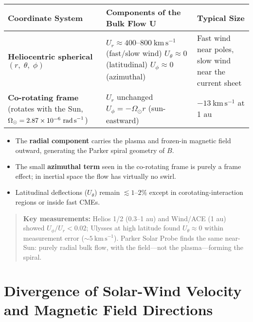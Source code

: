\begin{table}[h!]
\centering
\begin{tabular}{|p{7cm}|p{7cm}|p{4cm}|}
\hline
\textbf{Coordinate System} & \textbf{Components of the Bulk Flow $\mathbf{U}$} & \textbf{Typical Size} \\
\hline
\textbf{Heliocentric spherical} $(r,\;\theta,\;\phi)$
& 
$U_r \approx 400\text{--}800\ \mathrm{km\,s^{-1}}$ (fast/slow wind) \newline
$U_\theta \approx 0$ (latitudinal) \newline
$U_\phi \approx 0$ (azimuthal)
& 
Fast wind near poles, slow wind near the current sheet
\\
\hline
\textbf{Co-rotating frame} (rotates with the Sun, $\Omega_\odot=2.87\times10^{-6}\ \text{rad\,s}^{-1}$) 
& 
$U_r$ unchanged \newline
$U_\phi = -\Omega_\odot r$ (sun-eastward)
& 
$-13\ \mathrm{km\,s^{-1}}$ at 1 au
\\
\hline
\end{tabular}
\end{table}

\begin{itemize}
    \item The \textbf{radial component} carries the plasma and frozen-in magnetic field outward, generating the Parker spiral geometry of $B$.
    \item The small \textbf{azimuthal term} seen in the co-rotating frame is purely a frame effect; in inertial space the flow has virtually no swirl.
    \item Latitudinal deflections ($U_\theta$) remain $\lesssim 1$--$2\%$ except in corotating-interaction regions or inside fast CMEs.
\end{itemize}

\begin{quote}
\textbf{Key measurements:} \newline
Helios 1/2 (0.3--1 au) and Wind/ACE (1 au) showed $U_\phi/U_r < 0.02$; Ulysses at high latitude found $U_\theta \approx 0$ within measurement error ($\sim 5\ \mathrm{km\,s^{-1}}$). \newline
Parker Solar Probe finds the same near-Sun: purely radial bulk flow, with the field---not the plasma---forming the spiral.
\end{quote}


\section*{Divergence of Solar-Wind Velocity and Magnetic Field Directions}

